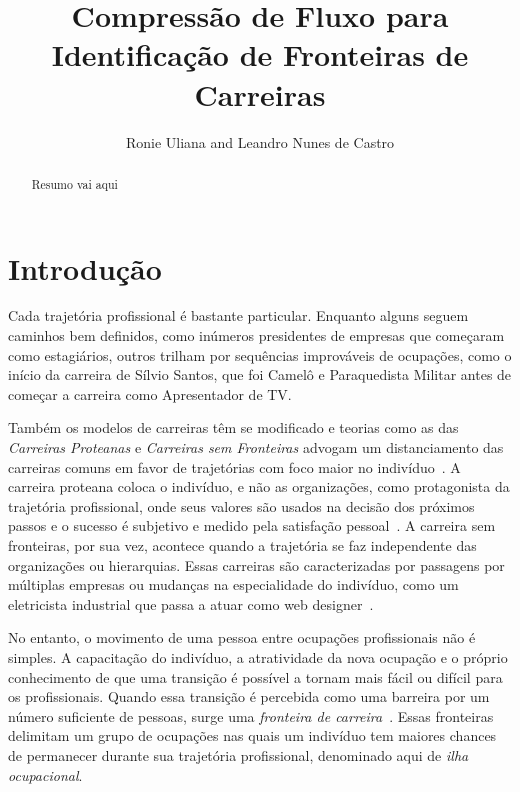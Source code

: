 \documentclass[
  article,
  11pt,
  a4paper,
  english,
  brazil,
  sumario=tradicional]{abntex2}
\title{Compressão de Fluxo para Identificação de Fronteiras de Carreiras}
\author{Ronie Uliana and Leandro Nunes de Castro}
\begin{document}

\frenchspacing

\maketitle

\begin{abstract}
Resumo vai aqui
\end{abstract}

\section{Introdução}

Cada trajetória profissional é bastante particular. Enquanto alguns seguem caminhos bem definidos, como inúmeros presidentes de empresas que começaram como estagiários, outros trilham por sequências improváveis de ocupações, como o início da carreira de Sílvio Santos, que foi Camelô e Paraquedista Militar antes de começar a carreira como Apresentador de TV.

Também os modelos de carreiras têm se modificado e teorias como as das \textit{Carreiras Proteanas} e \textit{Carreiras sem Fronteiras} advogam um distanciamento das carreiras comuns em favor de trajetórias com foco maior no indivíduo~\cite{Bendassolli2009-bg}. A carreira proteana coloca o indivíduo, e não as organizações, como protagonista da trajetória profissional, onde seus valores são usados na decisão dos próximos passos e o sucesso é subjetivo e medido pela satisfação pessoal~\cite{Hall2004-ke}. A carreira sem fronteiras, por sua vez, acontece quando a trajetória se faz independente das organizações ou hierarquias. Essas carreiras são caracterizadas por passagens por múltiplas empresas ou mudanças na especialidade do indivíduo, como um eletricista industrial que passa a atuar como web designer~\cite{Arthur1994-qq}.

No entanto, o movimento de uma pessoa entre ocupações profissionais não é simples. A capacitação do indivíduo, a atratividade da nova ocupação e o próprio conhecimento de que uma transição é possível a tornam mais fácil ou difícil para os profissionais. Quando essa transição é percebida como uma barreira por um número suficiente de pessoas, surge uma \textit{fronteira de carreira}~\cite{Gunz2007-hr}. Essas fronteiras delimitam um grupo de ocupações nas quais um indivíduo tem maiores chances de permanecer durante sua trajetória profissional, denominado aqui de \textit{ilha ocupacional}.
\end{document}
